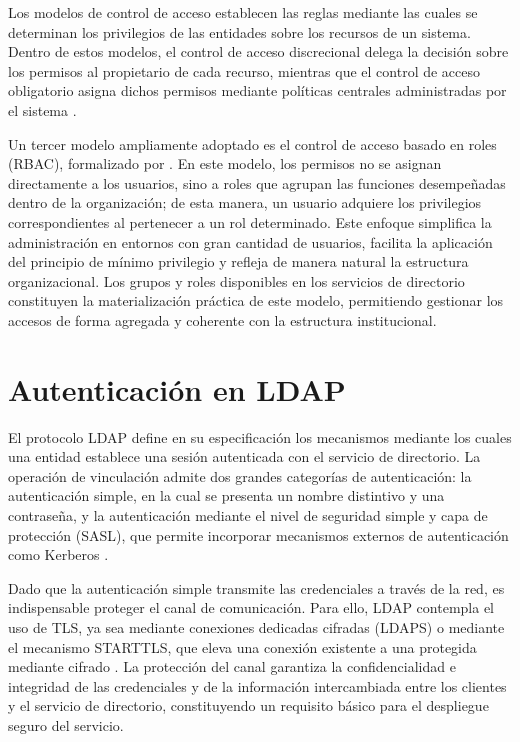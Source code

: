 Los modelos de control de acceso establecen las reglas mediante las cuales se determinan los privilegios de las entidades sobre los recursos de un sistema. Dentro de estos modelos, el control de acceso discrecional delega la decisión sobre los permisos al propietario de cada recurso, mientras que el control de acceso obligatorio asigna dichos permisos mediante políticas centrales administradas por el sistema \citep{RFC4949}.

Un tercer modelo ampliamente adoptado es el control de acceso basado en roles (\acs{RBAC}), formalizado por \citet{Sandhu1996}. En este modelo, los permisos no se asignan directamente a los usuarios, sino a roles que agrupan las funciones desempeñadas dentro de la organización; de esta manera, un usuario adquiere los privilegios correspondientes al pertenecer a un rol determinado. Este enfoque simplifica la administración en entornos con gran cantidad de usuarios, facilita la aplicación del principio de mínimo privilegio y refleja de manera natural la estructura organizacional. Los grupos y roles disponibles en los servicios de directorio constituyen la materialización práctica de este modelo, permitiendo gestionar los accesos de forma agregada y coherente con la estructura institucional.

\section{Autenticación en \texorpdfstring{\acs{LDAP}}{LDAP}}

El protocolo \acs{LDAP} define en su especificación los mecanismos mediante los cuales una entidad establece una sesión autenticada con el servicio de directorio. La operación de vinculación admite dos grandes categorías de autenticación: la autenticación simple, en la cual se presenta un nombre distintivo y una contraseña, y la autenticación mediante el nivel de seguridad simple y capa de protección (\acs{SASL}), que permite incorporar mecanismos externos de autenticación como Kerberos \citep{RFC4513}.

Dado que la autenticación simple transmite las credenciales a través de la red, es indispensable proteger el canal de comunicación. Para ello, \acs{LDAP} contempla el uso de \acs{TLS}, ya sea mediante conexiones dedicadas cifradas (\acs{LDAPS}) o mediante el mecanismo STARTTLS, que eleva una conexión existente a una protegida mediante cifrado \citep{RFC4513}. La protección del canal garantiza la confidencialidad e integridad de las credenciales y de la información intercambiada entre los clientes y el servicio de directorio, constituyendo un requisito básico para el despliegue seguro del servicio.

